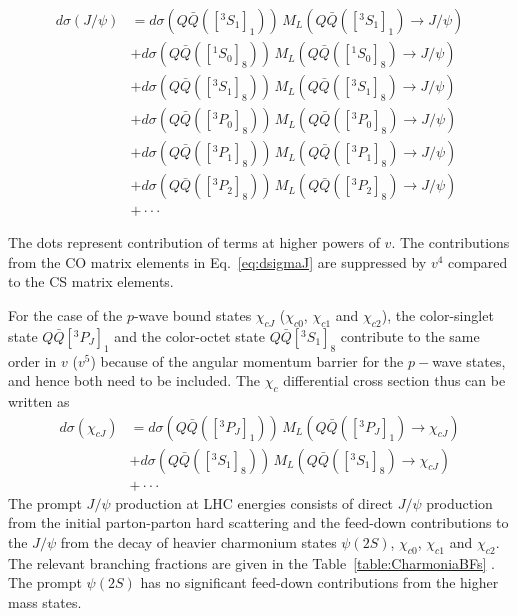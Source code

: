 \documentclass[12pt,a4paper,final]{iopart}
\newcommand{\barQ}{{\bar{Q}}}
\begin{document}
\begin{equation}
\begin{split}
d\sigma(J/\psi) &=d\sigma(Q\barQ([^3S_1]_{1}))\,M_{L}(Q\barQ([^3S_1]_{1})\rightarrow J/\psi)\\ 
                &+d\sigma(Q\barQ([^1S_0]_{8}))\,M_{L}(Q\barQ([^1S_0]_{8})\rightarrow J/\psi)\\ 
                &+d\sigma(Q\barQ([^3S_1]_{8}))\,M_{L}(Q\barQ([^3S_1]_{8})\rightarrow J/\psi)\\ 
                &+d\sigma(Q\barQ([^3P_0]_{8}))\,M_{L}(Q\barQ([^3P_0]_{8})\rightarrow J/\psi)\\ 
                &+d\sigma(Q\barQ([^3P_1]_{8}))\,M_{L}(Q\barQ([^3P_1]_{8})\rightarrow J/\psi)\\
                &+d\sigma(Q\barQ([^3P_2]_{8}))\,M_{L}(Q\barQ([^3P_2]_{8})\rightarrow J/\psi)\\
                &+ \cdot\cdot\cdot  
\label{eq:dsigmaJ}
\end{split}
\end{equation}


  The dots represent contribution of terms at higher powers of $v$. The 
contributions from the CO matrix elements in Eq.~\ref{eq:dsigmaJ} are suppressed 
by $v^4$ compared to the CS matrix elements.


  For the case of the $p$-wave bound states $\chi_{cJ}$ ($\chi_{c0}$, $\chi_{c1}$ 
and $\chi_{c2}$), the color-singlet state $Q\barQ[^3P_J]_{1}$ and the color-octet 
state $Q\barQ[^3S_1]_{8}$ contribute to the same order in $v$ ($v^{5}$) because of 
the angular momentum barrier for the $p-$wave states, and hence both need to be included. 
The $\chi_{c}$ differential cross section thus can be written as 
\begin{equation}
\begin{split}
d\sigma(\chi_{cJ}) &=d\sigma(Q\barQ([^3P_J]_{1}))\,M_{L}(Q\barQ([^3P_J]_{1})\rightarrow \chi_{cJ})\\ 
                  &+d\sigma(Q\barQ([^3S_1]_{8}))\,M_{L}(Q\barQ([^3S_1]_{8})\rightarrow \chi_{cJ})\\
                  &+\cdot\cdot\cdot  
\label{eq:dsigmachi}
\end{split}
\end{equation}
  The prompt $J/\psi$ production at LHC energies consists of direct $J/\psi$ 
production from the initial parton-parton hard scattering and the feed-down contributions 
to the $J/\psi$ from the decay of heavier charmonium states $\psi(2S)$, 
$\chi_{c0}$, $\chi_{c1}$ and $\chi_{c2}$.  The relevant branching fractions are given 
in the Table~\ref{table:CharmoniaBFs} \cite{Nakamura:2010zzi}. 
The prompt $\psi(2S)$ has no significant feed-down contributions from the higher mass states. 
\end{document}
